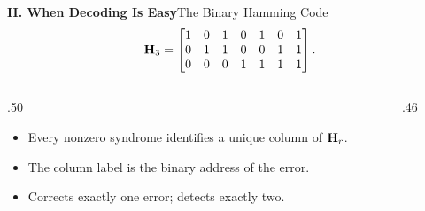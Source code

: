 \begin{frame}{\textbf{II. When Decoding Is Easy}}{The Binary Hamming Code}
\small
{}
\[
  \mathbf{H}_3=\begin{bmatrix}1&0&1&0&1&0&1\\0&1&1&0&0&1&1\\0&0&0&1&1&1&1\end{bmatrix}.
\]
\begin{columns}[T,onlytextwidth]
\begin{column}{.50\textwidth}
\begin{itemize}
  \item Every nonzero syndrome identifies a unique column of $\mathbf{H}_r$.
  \item The column label is the binary address of the error.
  \item Corrects exactly one error; detects exactly two.
\end{itemize}
\end{column}
\begin{column}{.46\textwidth}
\end{column}
\end{columns}
\end{frame}


